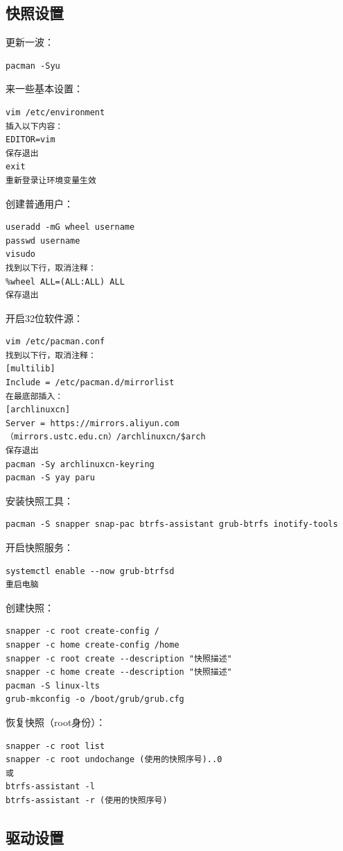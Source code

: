 \documentclass[a4paper, twocolumn, twoside, 10pt]{article}
\begin{document}
\subsection{快照设置}

更新一波：
\begin{lstlisting}
pacman -Syu
\end{lstlisting}

来一些基本设置：
\begin{lstlisting}
vim /etc/environment
插入以下内容：
EDITOR=vim
保存退出
exit
重新登录让环境变量生效
\end{lstlisting}

创建普通用户：
\begin{lstlisting}
useradd -mG wheel username
passwd username
visudo
找到以下行，取消注释：
%wheel ALL=(ALL:ALL) ALL
保存退出
\end{lstlisting}

开启32位软件源：
\begin{lstlisting}
vim /etc/pacman.conf
找到以下行，取消注释：
[multilib] 
Include = /etc/pacman.d/mirrorlist
在最底部插入：
[archlinuxcn]
Server = https://mirrors.aliyun.com
（mirrors.ustc.edu.cn）/archlinuxcn/$arch
保存退出
pacman -Sy archlinuxcn-keyring
pacman -S yay paru
\end{lstlisting}

安装快照工具：
\begin{lstlisting}
pacman -S snapper snap-pac btrfs-assistant grub-btrfs inotify-tools
\end{lstlisting}

开启快照服务：
\begin{lstlisting}
systemctl enable --now grub-btrfsd
重启电脑
\end{lstlisting}

创建快照：
\begin{lstlisting}
snapper -c root create-config /
snapper -c home create-config /home
snapper -c root create --description "快照描述"
snapper -c home create --description "快照描述"
pacman -S linux-lts
grub-mkconfig -o /boot/grub/grub.cfg
\end{lstlisting}

恢复快照（root身份）：
\begin{lstlisting}
snapper -c root list
snapper -c root undochange (使用的快照序号)..0
或
btrfs-assistant -l
btrfs-assistant -r (使用的快照序号)
\end{lstlisting}

\subsection{驱动设置}
\end{document}
